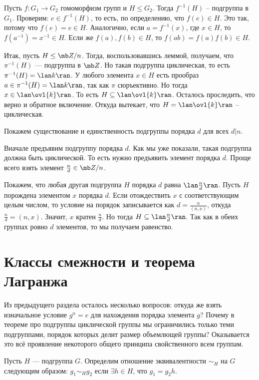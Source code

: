 \lm Пусть $f\colon G_1\to G_2$ гомоморфизм групп и $H\leq G_2$. Тогда $f^{-1}(H)$ -- подгруппа в $G_1$.
\elm
\proof Проверим: $e \in f^{-1}(H)$, то есть, по определению, что $f(e)\in H$. Это так, потому что $f(e)=e\in H$. Аналогично, если $a=f^{-1}(x)$, где $x \in H$, то $f(a^{-1})=x^{-1}\in H$. Если же $f(a), f(b) \in H$, то $f(ab)=f(a)f(b)\in H$. 
\endproof

Итак, пусть $H\leq \mb Z/n$. Тогда, воспользовавшись леммой, получаем, что  $\pi^{-1}(H)$ ---  подгруппа в $\mb Z$. Но такая подгруппа циклическая, то есть $\pi^{-1}(H)=\lan k \ran$. У любого элемента $x\in H$ есть прообраз $a\in \pi^{-1}(H)=\lan k \ran$, так как $\pi$ сюръективно. Но тогда $x\in \lan \ovl{k} \ran$. То есть $H\subseteq \lan \ovl{k}\ran$. Осталось проследить, что верно и обратное включение. Откуда вытекает, что $H=\lan \ovl{k}\ran$ -- циклическая.

Покажем существование и единственность подгруппы порядка $d$ для всех $d|n$.

Вначале предъявим подгруппу порядка $d$. Как мы уже показали, такая подгруппа должна быть циклической. То есть нужно предъявить элемент порядка $d$. Проще всего взять элемент $\frac{n}{d}\in \mb Z/n$.

Покажем, что любая другая подгруппа $H$ порядка $d$ равна $\lan \frac{n}{d} \ran$. Пусть $H$ порождена элементом $x$ порядка $d$. Если отождествить $x$ с соответствующим целым числом, то условие на порядок записывается как  $d=\frac{n}{(n,x)}$, откуда $\frac{n}{d}=(n,x)$. Значит, $x$ кратен $\frac{n}{d}$. Но тогда $H \subseteq \lan\frac{n}{d}\ran$. Так как в обеих группах ровно $d$ элементов, то мы получаем равенство.
\endproof




\section{Классы смежности и теорема Лагранжа}

Из предыдущего раздела осталось несколько вопросов: откуда же взять изначальное условие $g^n=e$ для нахождения порядка элемента $g$? Почему в теореме про подгруппы циклической группы мы ограничились только теми подгруппами, порядок которых делит размер объемлющей группы? Оказывается это всё проявление некоторого общего принципа свойственного всем группам.


\dfn Пусть $H$ --- подгруппа $G$. Определим отношение эквивалентности $\sim_H$ на $G$ следующим образом: $g_1\sim_H g_2$ если $\exists h \in H$, что $g_1=g_2 h$.
\edfn

